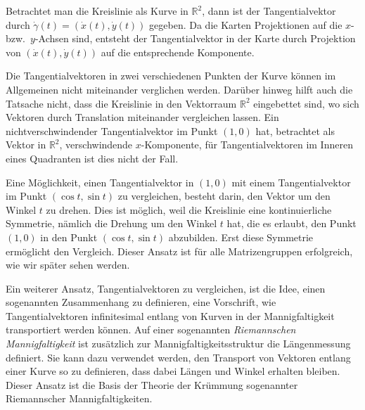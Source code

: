 Betrachtet man die Kreislinie als Kurve in $\mathbb{R}^2$,
dann ist der Tangentialvektor durch
$\dot{\gamma}(t)=(\dot{x}(t),\dot{y}(t))$ gegeben.
Da die Karten Projektionen auf die $x$- bzw.~$y$-Achsen sind,
entsteht der Tangentialvektor in der Karte durch Projektion
von $(\dot{x}(t),\dot{y}(t))$ auf die entsprechende Komponente.

Die Tangentialvektoren in zwei verschiedenen Punkten der Kurve können
im Allgemeinen nicht miteinander verglichen werden.
Darüber hinweg hilft auch die Tatsache nicht, dass die Kreislinie
in den Vektorraum $\mathbb{R}^2$ eingebettet sind, wo sich Vektoren
durch Translation miteinander vergleichen lassen.
Ein nichtverschwindender Tangentialvektor im Punkt $(1,0)$ hat, 
betrachtet als Vektor in $\mathbb{R}^2$, verschwindende $x$-Komponente,
für Tangentialvektoren im Inneren eines Quadranten ist dies nicht
der Fall.

Eine Möglichkeit, einen Tangentialvektor in $(1,0)$ mit einem
Tangentialvektor im Punkt $(\cos t,\sin t)$ zu vergleichen, besteht
darin, den Vektor um den Winkel $t$ zu drehen.
Dies ist möglich, weil die Kreislinie eine kontinuierliche Symmetrie,
nämlich die Drehung um den Winkel $t$ hat, die es erlaubt, den Punkt $(1,0)$
in den Punkt $(\cos t,\sin t)$ abzubilden.
Erst diese Symmetrie ermöglicht den Vergleich.
Dieser Ansatz ist für alle Matrizengruppen erfolgreich,
wie wir später sehen werden.

Ein weiterer Ansatz, Tangentialvektoren zu vergleichen, ist die Idee, 
einen sogenannten Zusammenhang zu definieren, eine Vorschrift, wie
%
%
Tangentialvektoren infinitesimal entlang von Kurven in der Mannigfaltigkeit
transportiert werden können.
Auf einer sogenannten {\em Riemannschen Mannigfaltigkeit} ist zusätzlich
zur Mannigfaltigkeitsstruktur die Längenmessung definiert.
%
%
Sie kann dazu verwendet werden, den Transport von Vektoren entlang einer
Kurve so zu definieren, dass dabei Längen und Winkel erhalten bleiben.
%
Dieser Ansatz ist die Basis der Theorie der Krümmung sogenannter
Riemannscher Mannigfaltigkeiten.
%








